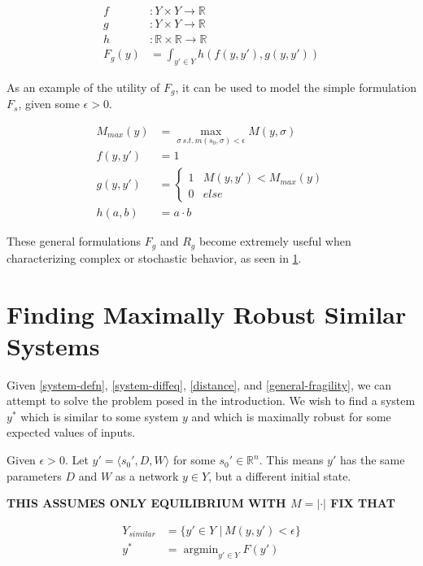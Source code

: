 \documentclass{article}
\DeclareMathOperator*{\argmin}{argmin}
\begin{document}
\begin{align}
  f &: Y \times Y \to \mathbb{R} \\
  g &: Y \times Y \to \mathbb{R} \\
  h &: \mathbb{R} \times \mathbb{R} \to \mathbb{R} \\
  F_g(y) &= \int_{y' \in Y} h(f(y, y'), g(y, y')) \label{general-fragility}
\end{align}

As an example of the utility of $F_g$, it can be used to model the simple formulation $F_s$, given some $\epsilon > 0$.

\begin{align}
  M_{max}(y) &= \max\limits_{\sigma \,s.t.\, m(s_0, \sigma) < \epsilon} M(y, \sigma) \\
  f(y, y') &= 1 \\
  g(y, y') &= \begin{cases}
    1 & M(y, y') < M_{max}(y) \\
    0 & else
  \end{cases} \\
  h(a, b) &= a \cdot b
\end{align}

These general formulations $F_g$ and $R_g$ become extremely useful when characterizing complex or stochastic behavior, as seen in \ref{max-robust}.

\section{Finding Maximally Robust Similar Systems} \label{max-robust}
Given \eqref{system-defn}, \eqref{system-diffeq}, \eqref{distance}, and \eqref{general-fragility}, we can attempt to solve the problem posed in the introduction. We wish to find a system $y^*$ which is similar to some system $y$ and which is maximally robust for some expected values of inputs.

Given $\epsilon > 0$. Let $y' = \langle s_0', D, W \rangle$ for some $s_0' \in \mathbb{R}^n$. This means $y'$ has the same parameters $D$ and $W$ as a network $y \in Y$, but a different initial state.

\textbf{THIS ASSUMES ONLY EQUILIBRIUM WITH $M = \lvert \cdot \rvert$ FIX THAT}

\begin{align}
  Y_{similar} &= \{y' \in Y \,\,|\, M(y, y') < \epsilon \} \\
  y^* &= \argmin_{y' \in Y} F(y')
\end{align}
\end{document}
